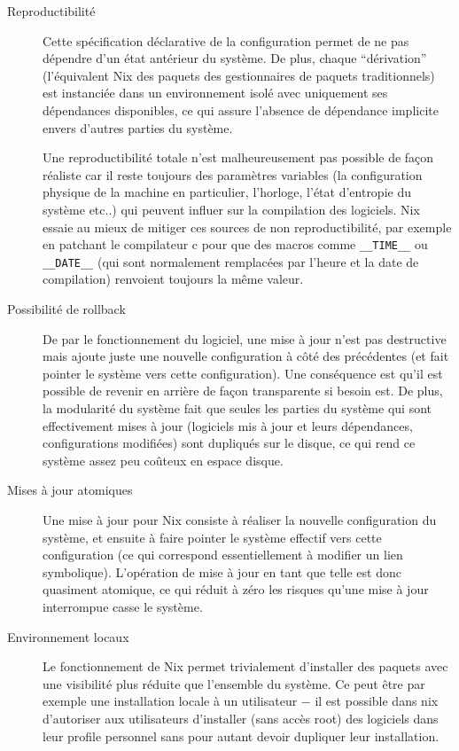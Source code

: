 \begin{description}
  \item[Reproductibilité] Cette spécification déclarative de la configuration
    permet de ne pas dépendre d'un état antérieur du système.
    De plus, chaque ``dérivation'' (l'équivalent Nix des paquets des
    gestionnaires de paquets traditionnels) est instanciée dans un
    environnement isolé avec uniquement ses dépendances disponibles, ce qui
    assure l'absence de dépendance implicite envers d'autres parties du système.

    Une reproductibilité totale n'est malheureusement pas possible de façon
    réaliste car il reste toujours des paramètres variables (la configuration
    physique de la machine en particulier, l'horloge, l'état d'entropie du
    système etc..) qui peuvent influer sur la compilation des logiciels. Nix
    essaie au mieux de mitiger ces sources de non reproductibilité, par exemple
    en patchant le compilateur c pour que des macros comme \verb|__TIME__| ou
    \verb|__DATE__| (qui sont normalement remplacées par l'heure et la date de
    compilation) renvoient toujours la même valeur.

  \item[Possibilité de rollback] De par le fonctionnement du logiciel, une mise
    à jour n'est pas destructive mais ajoute juste une nouvelle configuration à
    côté des précédentes (et fait pointer le système vers cette configuration).
    Une conséquence est qu'il est possible de revenir en arrière de façon
    transparente si besoin est.
    De plus, la modularité du système fait que seules les parties du système
    qui sont effectivement mises à jour (logiciels mis à jour et leurs
    dépendances, configurations modifiées) sont dupliqués sur le disque, ce qui
    rend ce système assez peu coûteux en espace disque.

  \item[Mises à jour atomiques] Une mise à jour pour Nix consiste à réaliser la
    nouvelle configuration du système, et ensuite à faire pointer le système
    effectif vers cette configuration (ce qui correspond essentiellement à
    modifier un lien symbolique). L'opération de mise à jour en tant que
    telle est donc quasiment atomique, ce qui réduit à zéro les risques qu'une
    mise à jour interrompue casse le système.

  \item[Environnement locaux] Le fonctionnement de Nix permet trivialement
    d'installer des paquets avec une visibilité plus réduite que l'ensemble du
    système. Ce peut être par exemple une installation locale à un utilisateur
    − il est possible dans nix d'autoriser aux utilisateurs d'installer (sans
    accès root) des logiciels dans leur profile personnel sans pour autant
    devoir dupliquer leur installation.


\end{description}
